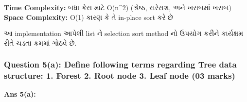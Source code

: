 \begin{Shaded}
\begin{Highlighting}[]
\end{Highlighting}
\end{Shaded}

\textbf{Time Complexity:} બધા કેસ માટે O(n\^{}2) (શ્રેષ્ઠ, સરેરાશ, અને ખરાબમાં
ખરાબ) \textbf{Space Complexity:} O(1) કારણ કે તે in-place sort કરે છે

આ implementation આપેલી list ને selection sort method નો ઉપયોગ કરીને કાર્યક્ષમ
રીતે ચડતા ક્રમમાં ગોઠવે છે.

\hypertarget{question-5a-define-following-terms-regarding-tree-data-structure-1.-forest-2.-root-node-3.-leaf-node-03-marks}{%
\subsubsection{Question 5(a): Define following terms regarding Tree data
structure: 1. Forest 2. Root node 3. Leaf node (03
marks)}\label{question-5a-define-following-terms-regarding-tree-data-structure-1.-forest-2.-root-node-3.-leaf-node-03-marks}}

\textbf{Ans 5(a):}

